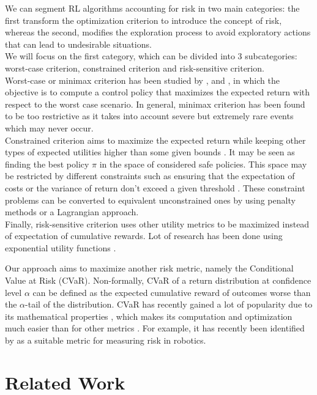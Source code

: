 We can segment RL algorithms accounting for risk in two main categories: the first transform 
the optimization criterion to introduce the concept of risk, whereas the second, modifies
the exploration process to avoid exploratory actions that can lead to undesirable situations.\\
We will focus on the first category, which can be divided into 3 subcategories: worst-case
criterion, constrained criterion and risk-sensitive criterion.\\
Worst-case or minimax criterion has been studied by \citet{Heger1994}, 
\citet{Coraluppi1997} and \citet{Coraluppi1999},
in which the objective is to compute a control policy that maximizes the expected return
with respect to the worst case scenario. In general, minimax criterion has
been found to be too restrictive as it takes into
account severe but extremely rare events which may never occur.\\
Constrained criterion  aims to maximize the expected return while keeping
other types of expected utilities higher than some given bounds \citep{Altman1993}.
It may be seen as finding the best policy $\pi$ in the space of considered safe policies.
This space may be restricted by different constraints such as ensuring that
the expectation of costs \citep{Geibel2006} or the variance of return don't exceed
a given threshold \citep{Tamar2012}.
These constraint problems can be converted to equivalent unconstrained ones by using
penalty methods or a Lagrangian approach.\\
Finally, risk-sensitive criterion uses other utility metrics to be maximized instead of
expectation of cumulative rewards.
Lot of research has been done using exponential utility functions
\citep{Howard1972,Chung1987}.

Our approach aims to maximize
another risk metric, namely the Conditional Value at Risk (CVaR).
Non-formally, CVaR of a return distribution at confidence level $\alpha$ can be defined as the expected
cumulative reward of outcomes worse than the $\alpha$-tail of the distribution.
CVaR has recently gained a lot of popularity due to its mathematical properties \citep{Artzner1999},
which makes its computation and optimization much easier than for other metrics  \citep{Rockafellar2000}.
For example, 
it has recently been identified by \citet{Majumdar2020} as a suitable metric
for measuring risk in robotics.

\section{Related Work}


